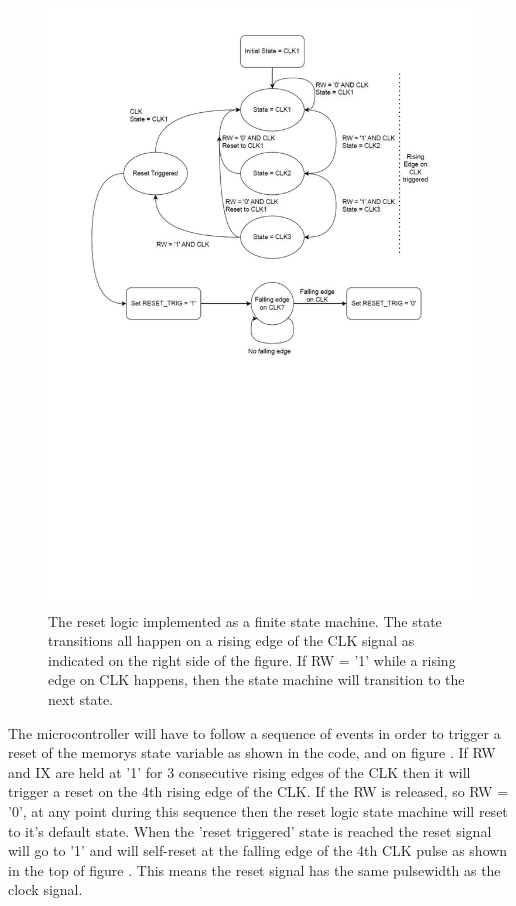 \begin{figure}[H]
    \centering
    \includegraphics[clip, trim=0 0 0 0, width=1\textwidth]{Sections/7_SystemDesign/Figures/7_2_2_ResetLogicFSM.pdf}
    \caption{The reset logic implemented as a finite state machine. The state transitions all happen on a rising edge of the CLK signal as indicated on the right side of the figure. If RW = '1' while a rising edge on CLK happens, then the state machine will transition to the next state.}
    \label{fig:7_2_2_ResetLogicFSM}
\end{figure}

The microcontroller will have to follow a sequence of events in order to trigger a reset of the memorys state variable as shown in the code, and on figure . If RW and IX are held at '1' for 3 consecutive rising edges of the CLK then it will trigger a reset on the 4th rising edge of the CLK. If the RW is released, so RW = '0', at any point during this sequence then the reset logic state machine will reset to it's default state. When the 'reset triggered' state is reached the reset signal will go to '1' and will self-reset at the falling edge of the 4th CLK pulse as shown in the top of figure . This means the reset signal has the same pulsewidth as the clock signal.